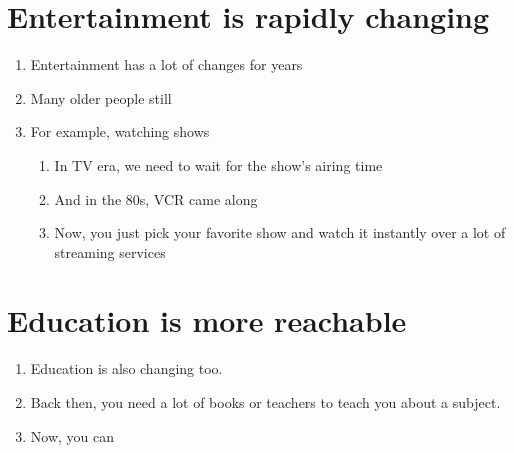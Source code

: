 \documentclass[a4paper, 12pt]{article}
\begin{document}
    \section{Entertainment is rapidly changing}
        \begin{enumerate}
            \item Entertainment has a lot of changes for years
            \item Many older people still 
            \item For example, watching shows
            \begin{enumerate}[label*=\arabic*.]
                \item In TV era, we need to wait for the show's airing time
                \item And in the 80s, VCR came along
                \item Now, you just pick your favorite show and watch it instantly over a lot of streaming services
            \end{enumerate}
        \end{enumerate}

    \section{Education is more reachable}
        \begin{enumerate}
            \item Education is also changing too.
            \item Back then, you need a lot of books or teachers to teach you about a subject.
            \item Now, you can 
        \end{enumerate}
\end{document}
